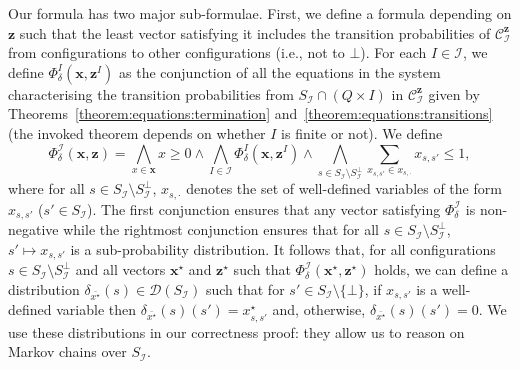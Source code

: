 \documentclass[a4paper,UKenglish,cleveref,autoref,thm-restate,colorlinks]{lipics-v2021}
\newcommand{\dist}[1]{\mathcal{D}(#1)}
\newcommand{\mdpStateSpace}{S}
\newcommand{\mdpTrans}{\delta}
\newcommand{\ocStateSpace}{Q}
\newcommand{\ocConfig}{s}
\newcommand{\ocTrans}{\delta}
\newcommand{\mchain}{\mathcal{C}}
\newcommand{\intPart}{\mathcal{I}}
\newcommand{\interval}{I}
\newcommand{\compressChainStrat}[1]{\mchain^{#1}_{\intPart}}
\newcommand{\compressChainStateSpace}{\mdpStateSpace_{\intPart}}
\newcommand{\compressChainStateSpaceStar}{\mdpStateSpace_{\intPart}^{\bot}}
\newcommand{\varTrans}{x}
\newcommand{\varTransTuple}{\mathbf{\varTrans}}
\newcommand{\solTrans}{\varTrans^\star}
\newcommand{\solTransTuple}{\mathbf{\varTrans}^{\star}}
\newcommand{\varStrat}{z}
\newcommand{\varStratI}{\mathbf{\varStrat}^{\interval}}
\newcommand{\varStratTuple}{\mathbf{\varStrat}}
\newcommand{\solStratTuple}{\mathbf{\varStrat}^{\star}}
\newcommand{\compressChainSymbolic}{\compressChainStrat{\varStratTuple}}
\newcommand{\formulaTransBase}{\Phi_{\ocTrans}}
\newcommand{\formulaTrans}{\formulaTransBase^\intPart}
\newcommand{\formulaTransI}{\formulaTransBase^\interval}
\begin{document}
Our formula has two major sub-formulae. First, we define a formula depending on $\varStratTuple$ such that the least vector satisfying it includes the transition probabilities of $\compressChainSymbolic$ from configurations to other configurations (i.e., not to $\bot$).
For each $\interval\in\intPart$, we define $\formulaTransI(\varTransTuple,\varStratI)$ as the conjunction of all the equations in the system characterising the transition probabilities from $\compressChainStateSpace\cap(\ocStateSpace\times\interval)$ in $\compressChainSymbolic$ given by Theorems~\ref{theorem:equations:termination} and~\ref{theorem:equations:transitions} (the invoked theorem depends on whether $\interval$ is finite or not).
We define
\begin{equation}\label{equation:verification:formula:transitions}
  \formulaTrans(\varTransTuple, \varStratTuple) =
  \bigwedge_{\varTrans\in\varTransTuple}\varTrans\geq 0\land
  \bigwedge_{\interval\in\intPart}
    \formulaTransI(\varTransTuple, \varStratI)\land
    \bigwedge_{\ocConfig\in\compressChainStateSpace\setminus\compressChainStateSpaceStar}
    \sum_{\varTrans_{\ocConfig, \ocConfig'}\in\varTrans_{\ocConfig, \cdot}}\varTrans_{\ocConfig, \ocConfig'}\leq 1,
  \end{equation}
  where for all $\ocConfig\in\compressChainStateSpace\setminus\compressChainStateSpaceStar$, $\varTrans_{\ocConfig, \cdot}$ denotes the set of well-defined  variables of the form $\varTrans_{\ocConfig, \ocConfig'}$ ($\ocConfig'\in\compressChainStateSpace$).
The first conjunction ensures that any vector satisfying $\formulaTrans$ is non-negative while the rightmost conjunction ensures that for all $\ocConfig\in\compressChainStateSpace\setminus\compressChainStateSpaceStar$, $\ocConfig'\mapsto\varTrans_{\ocConfig, \ocConfig'}$ is a sub-probability distribution.
It follows that, for all configurations $\ocConfig\in\compressChainStateSpace\setminus\compressChainStateSpaceStar$ and all vectors $\solTransTuple$ and $\solStratTuple$ such that $\formulaTrans(\solTransTuple, \solStratTuple)$ holds, we can define a distribution $\mdpTrans_{\bar{\solTrans}}(\ocConfig)\in\dist{\compressChainStateSpace}$ such that for $\ocConfig'\in\compressChainStateSpace\setminus\{\bot\}$, if $\varTrans_{\ocConfig, \ocConfig'}$ is a well-defined variable then  $\mdpTrans_{\bar{\solTrans}}(\ocConfig)(\ocConfig') = \solTrans_{\ocConfig, \ocConfig'}$ and, otherwise, $\mdpTrans_{\bar{\solTrans}}(\ocConfig)(\ocConfig') = 0$.
We use these distributions in our correctness proof: they allow us to reason on Markov chains over $\compressChainStateSpace$.
\end{document}
